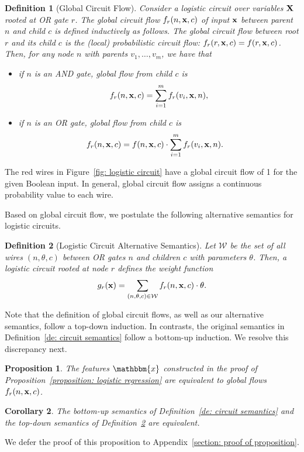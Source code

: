 \documentclass[letterpaper]{article} %
\newtheorem{corollary}{Corollary}
\newtheorem{proposition}[corollary]{Proposition}
\newtheorem{definition}{Definition}
\newcommand{\coe}{g}
\newcommand{\sample}{{\bf x}}
\begin{document}
\begin{definition}[Global Circuit Flow]
    \label{definition: global flow}
    Consider a logistic circuit over variables $\bf X$ rooted at OR gate $r$.
    The global circuit flow $f_r(n, \sample, c)$ of input $\sample $ between parent $n$ and child $c$ is defined inductively as follows.
    The global circuit flow between root $r$ and its child $c$ is the (local) probabilistic circuit flow: $f_r(r, \sample, c) = f(r, \sample, c)$.
    Then, for any node $n$ with parents $v_1,\dots,v_m$, we have that
    \begin{itemize}
        \item[--] if $n$ is an AND gate, global flow from child $c$ is
        \begin{align*}
            f_r(n, \sample, c) = \sum_{i=1}^m f_r(v_i, \sample, n),
        \end{align*}
        \item[--] if $n$ is an OR gate, global flow from child $c$ is
        \begin{align*}
            f_r(n, \sample, c) &=  f(n, \sample,c) \cdot \sum_{i=1}^m  f_r(v_i, \sample, n).
        \end{align*}
    \end{itemize}
\end{definition}
The red wires in Figure~\ref{fig: logistic circuit} have a global circuit flow of 1 for the given Boolean input. In general, global circuit flow assigns a continuous probability value to each wire.

Based on global circuit flow, we postulate the following alternative semantics for logistic circuits.
\begin{definition}[Logistic Circuit Alternative Semantics]
\label{definition: circuit semantic using global flow}
Let $\mathcal{W}$ be the set of all wires $(n,
\theta,c)$ between OR gates $n$ and children $c$ with parameters $\theta$.
Then, a logistic circuit rooted at node $r$ defines the weight function
$$
	\coe_r(\sample) = \sum_{(n,\theta,c) \in \mathcal{W}} f_r(n,\sample,c) \cdot \theta.
$$
\end{definition}

Note that the definition of global circuit flows, as well as our alternative semantics, follow a top-down induction.
In contrasts, the original semantics in Definition~\ref{de: circuit semantics} follow a bottom-up induction.
We resolve this discrepancy next.
\begin{proposition}
\label{proposition: features}
The features $\mathbbm{x}$ constructed in the proof of Proposition~\ref{proposition: logistic regression} are equivalent to global flows $f_r(n,\sample,c)$.
\end{proposition}
\begin{corollary}
The bottom-up semantics of Definition~\ref{de: circuit semantics} and the top-down semantics of Definition~\ref{definition: circuit semantic using global flow} are equivalent.
\end{corollary}
\noindent We defer the proof of this proposition to Appendix~\ref{section: proof of proposition}.
\end{document}
